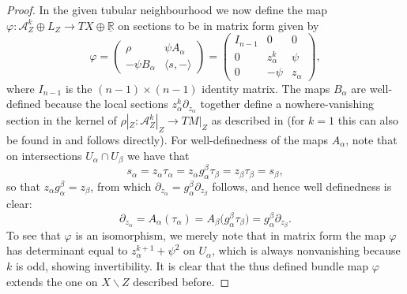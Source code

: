 \documentclass[pdftex]{sigma}
\numberwithin{equation}{section}
\begin{document}
\begin{proof}
In the given tubular neighbourhood we now define the map $\varphi\colon \mathcal{A}_Z^k \oplus L_Z \to TX \oplus \underline{\mathbb{R}}$ on sections to be in matrix form given by
\begin{displaymath}
	\varphi = \begin{pmatrix} \rho & \psi A_\alpha \\ -\psi B_\alpha & \langle s , - \rangle \end{pmatrix} = \begin{pmatrix} I_{n-1} & 0 & 0 \\ 0 & z_\alpha^k & \psi \\ 0 & -\psi & z_\alpha \end{pmatrix},
\end{displaymath}
where $I_{n-1}$ is the $(n-1) \times (n-1)$ identity matrix. The maps $B_\alpha$ are well-defined because the local sections $z_\alpha^k \partial_{z_\alpha}$ together define a nowhere-vanishing section in the kernel of $\rho|_Z\colon \mathcal{A}_Z^k|_Z \to TM|_Z$ as described in \cite[Proposition 2.3]{Scott16} (for $k = 1$ this can also be found in \cite{GuilleminMirandaPires14} and follows directly). For well-definedness of the maps $A_\alpha$, note that on intersections $U_\alpha \cap U_\beta$ we have that
\begin{displaymath}
	s_\alpha = z_\alpha \tau_\alpha = z_\alpha g_\alpha^\beta \tau_\beta = z_\beta \tau_\beta = s_\beta,
\end{displaymath}
so that $z_\alpha g_\alpha^\beta = z_\beta$, from which $\partial_{z_\alpha} = g_\alpha^\beta \partial_{z_\beta}$ follows, and hence well definedness is clear:
\begin{displaymath}
	\partial_{z_\alpha} = A_\alpha(\tau_\alpha) = A_\beta\big(g_\alpha^\beta \tau_\beta\big)= g_\alpha^\beta \partial_{z_\beta}.
\end{displaymath}
To see that $\varphi$ is an isomorphism, we merely note that in matrix form the map $\varphi$ has determinant equal to $z_\alpha^{k+1} + \psi^2$ on $U_\alpha$, which is always nonvanishing because $k$ is odd, showing invertibility. It is clear that the thus defined bundle map $\varphi$ extends the one on $X \backslash Z$ described before.


\end{proof}
\end{document}
